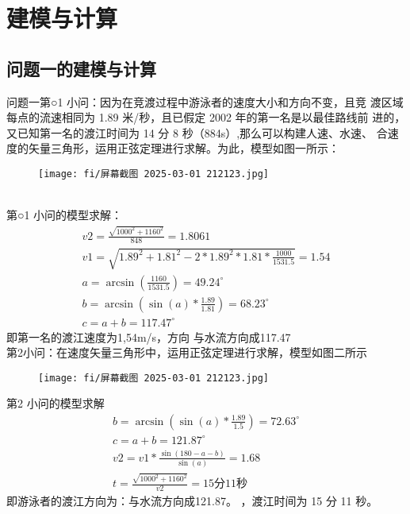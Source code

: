\documentclass{article}
\begin{document}
\section{建模与计算}
\subsection{问题一的建模与计算}

问题一第○1 小问：因为在竞渡过程中游泳者的速度大小和方向不变，且竞
渡区域每点的流速相同为 1.89 米/秒，且已假定 2002 年的第一名是以最佳路线前
进的，又已知第一名的渡江时间为 14 分 8 秒（884s）,那么可以构建人速、水速、
合速度的矢量三角形，运用正弦定理进行求解。为此，模型如图一所示：
\begin{figure}[h]
    \centering
    \texttt{[image: fi/屏幕截图 2025-03-01 212123.jpg]}
\end{figure}
\\ \indent 第○1 小问的模型求解：
\begin{eqnarray}
    v2=\frac{\sqrt{1000^2+1160^2}}{848}=1.8061 
   \\ v1=\sqrt{1.89^2+1.81^2-2*1.89^2*1.81*\frac{1000}{1531.5}}=1.54
    \\a=\arcsin(\frac{1160}{1531.5})=49.24^{\circ}
    \\b=\arcsin(\sin(a)*\frac{1.89}{1.81})=68.23^{\circ}
    \\c=a+b=117.47^{\circ}
\end{eqnarray}
 即第一名的渡江速度为1,54m/s，方向 与水流方向成117.47
\\ \indent 第2小问：在速度矢量三角形中，运用正弦定理进行求解，模型如图二所示
\begin{figure}[h]
    \centering
    \texttt{[image: fi/屏幕截图 2025-03-01 212123.jpg]}
\end{figure}
 第2 小问的模型求解
\begin{eqnarray}
    b=\arcsin(\sin(a)*\frac{1.89}{1.5})=72.63^{\circ}
    \\c=a+b=121.87^{\circ}
    \\v2=v1*\frac{\sin(180-a-b)}{\sin(a)}=1.68
    \\t= \frac{\sqrt{1000^2+1160^2}}{v2}=15分11秒
\end{eqnarray}
即游泳者的渡江方向为：与水流方向成121.87。 ，渡江时间为 15 分 11 秒。
\end{document}
